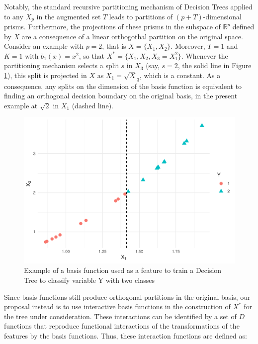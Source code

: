 \documentclass[]{elsarticle} %
\makeatletter
\def\maxwidth{\ifdim\Gin@nat@width>\linewidth\linewidth
\else\Gin@nat@width\fi}
\let\Oldincludegraphics\includegraphics
\renewcommand{\includegraphics}[1]{\Oldincludegraphics[width=\maxwidth]{#1}}
\makeatother
\begin{document}
Notably, the standard recursive partitioning mechanism of Decision Trees
applied to any \(X_p\) in the augmented set \(T\) leads to partitions of
\(\left(p+T\right)\)-dimensional prisms. Furthermore, the projections of
these prisms in the subspace of \(\mathbb{R}^{p}\) defined by \(X\) are
a consequence of a linear orthogothal partition on the original space.
Consider an example with \(p=2\), that is \(X=\{X_1,X_2\}\). Moreover,
\(T=1\) and \(K=1\) with \(b_1(x)=x^2\), so that
\(X^\ast=\{X_1,X_2,X_3=X_1^2\}\). Whenever the partitioning mechanism
selects a split \(s\) in \(X_3\) (say, \(s=2\), the solid line in Figure
\ref{fig:fig3-simple-basis}), this split is projected in \(X\) as
\(X_1=\sqrt X_3\), which is a constant. As a consequence, any splits on
the dimension of the basis function is equivalent to finding an
orthogonal decision boundary on the original basis, in the present
example at \(\sqrt 2\) in \(X_1\) (dashed line).

\begin{figure}
\centering
\includegraphics{Trees_with_Base_Functions_v3_files/figure-latex/fig3-simple-basis-1.pdf}
\caption{\label{fig:fig3-simple-basis}Example of a basis function used
as a feature to train a Decision Tree to classify variable Y with two
classes}
\end{figure}

Since basis functions still produce orthogonal partitions in the
original basis, our proposal instead is to use interactive basis
functions in the construction of \(X^\ast\) for the tree under
consideration. These interactions can be identified by a set of \(D\)
functions that reproduce functional interactions of the transformations
of the features by the basis functions. Thus, these interaction
functions are defined as:
\end{document}
